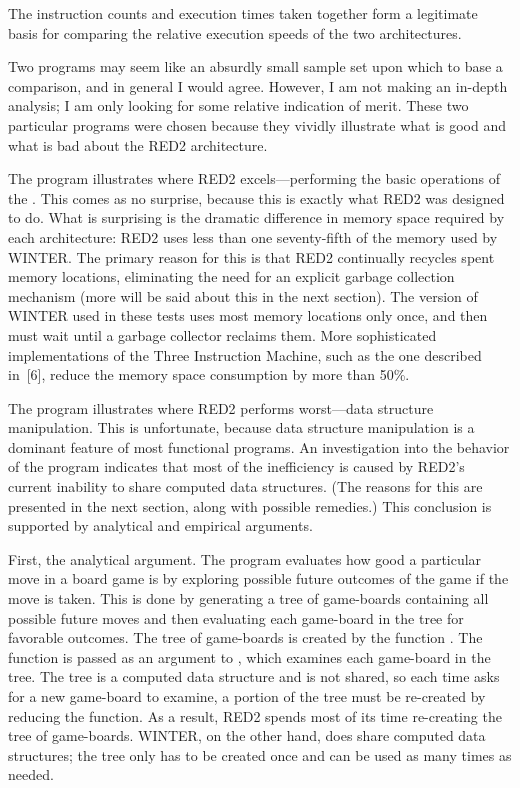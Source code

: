 The instruction counts and execution times taken together form a legitimate
basis for comparing the relative execution speeds of the two architectures.

Two programs may seem like an absurdly small sample set upon which to base a
comparison, and in general I would agree. However, I am not making an in-depth
analysis; I am only looking for some relative indication of merit. These two
particular programs were chosen because they vividly illustrate what is good and
what is bad about the RED2 architecture.

The  program illustrates where RED2 excels---performing the basic
operations of the \lambdacalculus{}. This comes as no surprise, because this is
exactly what RED2 was designed to do. What is surprising is the dramatic
difference in memory space required by each architecture: RED2 uses less than
one seventy-fifth of the memory used by WINTER. The primary reason for this is
that RED2 continually recycles spent memory locations, eliminating the need for
an explicit garbage collection mechanism (more will be said about this in the
next section). The version of WINTER used in these tests uses most memory
locations only once, and then must wait until a garbage collector reclaims them.
More sophisticated implementations of the Three Instruction Machine, such as
the one described in~[6], reduce the memory space consumption by more than
50\%.

The  program illustrates where RED2 performs worst---data structure
manipulation. This is unfortunate, because data structure manipulation is a
dominant feature of most functional programs. An investigation into the behavior
of the  program indicates that most of the inefficiency is caused by RED2's
current inability to share computed data structures. (The reasons for this are
presented in the next section, along with possible remedies.) This conclusion is
supported by analytical and empirical arguments.

First, the analytical argument. The  program evaluates how good a particular
move in a board game is by exploring possible future outcomes of the game if the
move is taken. This is done by generating a tree of game-boards containing all
possible future moves and then evaluating each game-board in the tree for
favorable outcomes. The tree of game-boards is created by the function
. The  function is passed as an argument to
, which examines each game-board in the tree. The tree is a
computed data structure and is not shared, so each time  asks
for a new game-board to examine, a portion of the tree must be re-created by
reducing the  function. As a result, RED2 spends most of its
time re-creating the tree of game-boards. WINTER, on the other hand, does share
computed data structures; the tree only has to be created once and can be used
as many times as needed.

